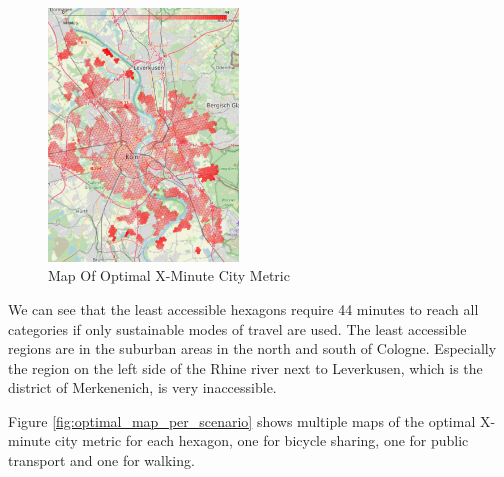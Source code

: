 \begin{figure}
  \begin{center}
    \includegraphics[width=0.45\textwidth]{Figures/results/minute_city_metric/optimal_map}
  \end{center}
  \caption{Map Of Optimal X-Minute City Metric}
  \label{fig:optimal_map}
\end{figure}

We can see that the least accessible hexagons require 44 minutes to reach all categories if only sustainable modes of travel are used.
The least accessible regions are in the suburban areas in the north and south of Cologne. 
Especially the region on the left side of the Rhine river next to Leverkusen, which is the district of Merkenenich, is very inaccessible.

Figure \ref{fig:optimal_map_per_scenario} shows multiple maps of the optimal X-minute city metric for each hexagon, one for bicycle sharing, one for public transport and one for walking.

